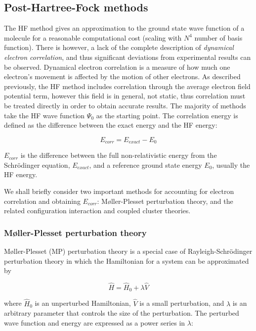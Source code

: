 \begin{doublespace}
\subsection{Post-Hartree-Fock methods}

The HF method gives an approximation to the ground state wave function of a
molecule for a reasonable computational cost (scaling with $N^4$ number of basis
function). There is however, a lack of the complete description of
\emph{dynamical electron correlation},\cite{Cramer2004} and thus significant
deviations from experimental results can be observed. Dynamical electron
correlation is a measure of how much one electron's movement is affected by the
motion of other electrons. As described previously, the HF method includes
correlation through the average electron field potential term, however this
field is in general, not static, thus correlation must be treated directly in
order to obtain accurate results. The majority of methods take the HF wave
function $\Psi_0$ as the starting point. The correlation energy is defined as
the difference between the exact energy and the HF energy:

\begin{equation}
  E_{corr} = E_{exact} - E_0
\end{equation}

\noindent $E_{corr}$ is the difference between the full non-relativistic energy
from the Schr{\"o}dinger equation, $E_{exact}$, and a reference ground state
energy $E_0$, usually the HF energy.

We shall briefly consider two important methods for accounting for electron
correlation and obtaining $E_{corr}$: M{\o}ller-Plesset perturbation theory,
and the related configuration interaction and coupled cluster theories.

\subsubsection{M{\o}ller-Plesset perturbation theory}

M{\o}ller-Plesset (MP) perturbation theory is a special case of
Rayleigh-Schr{\"o}dinger perturbation theory in which the Hamiltonian for a
system can be approximated by

\begin{equation}
  \hat{H} = \hat{H}_0 + \lambda\hat{V}
\end{equation}

\noindent where $\hat{H}_0$ is an unperturbed Hamiltonian, $\hat{V}$ is a small
perturbation, and $\lambda$ is an arbitrary parameter that controls the size
of the perturbation. The perturbed wave function and energy are expressed as a
power series in $\lambda$:


\end{doublespace}
